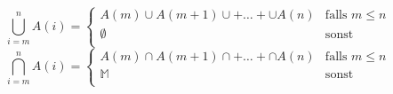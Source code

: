\[\bigcup\limits_{i=m}^n A(i) = \left\lbrace \begin{array}{ll}
                                                 A(m) \cup A(m + 1) \cup + \dots + \cup A(n) & \textrm{falls } m \leq n \\
                                                 \emptyset                                   & \textrm{sonst}           \\
\end{array}  \right.\]
\[\bigcap\limits_{i=m}^n A(i) = \left\lbrace \begin{array}{ll}
                                                 A(m) \cap A(m + 1) \cap + \dots + \cap A(n) & \textrm{falls } m \leq n \\
                                                 \mathbb{M}                                  & \textrm{sonst}           \\
\end{array}  \right.\]
